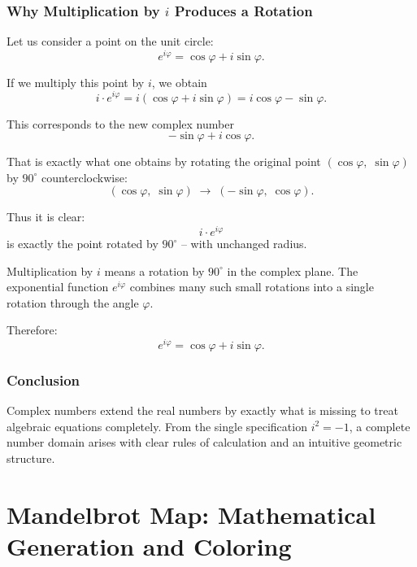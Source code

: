 \subsubsection*{Why Multiplication by \boldmath$i$ Produces a Rotation}

Let us consider a point on the unit circle:
\[
e^{i\varphi} = \cos\varphi + i\sin\varphi.
\]

If we multiply this point by $i$, we obtain
\[
i \cdot e^{i\varphi}
= i(\cos\varphi + i\sin\varphi)
= i\cos\varphi - \sin\varphi.
\]

This corresponds to the new complex number
\[
-\sin\varphi + i\cos\varphi.
\]

That is exactly what one obtains by rotating the original point
\((\cos\varphi,\;\sin\varphi)\)
by \(90^\circ\) counterclockwise:
\[
(\cos\varphi,\;\sin\varphi)
\;\longrightarrow\;
(-\sin\varphi,\;\cos\varphi).
\]

Thus it is clear:
\[
i \cdot e^{i\varphi}
\]
is exactly the point rotated by \(90^\circ\) -- with unchanged radius.

\begin{DidacticBox}
	\label{box:euler-coreidea}
	Multiplication by $i$ means a rotation by $90^\circ$ in the complex plane.
	The exponential function $e^{i\varphi}$ combines many such small rotations
	into a single rotation through the angle $\varphi$.
	
	Therefore:
	\[
	e^{i\varphi} = \cos\varphi + i\sin\varphi.
	\]
\end{DidacticBox}

\subsubsection*{Conclusion}

Complex numbers extend the real numbers by exactly what is missing
to treat algebraic equations completely.
From the single specification $i^2=-1$, a complete number domain arises
with clear rules of calculation and an intuitive geometric structure.

\section{Mandelbrot Map: Mathematical Generation and Coloring}
\label{app:mandelbrot-rendering}


